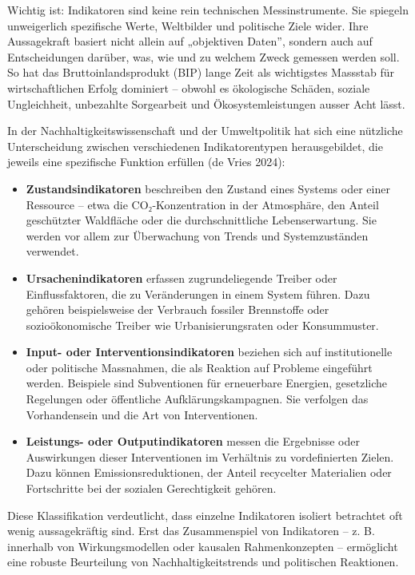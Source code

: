 \documentclass[
  nswissgerman,
  a4paper,
  DIV=11,
  numbers=noendperiod,
  oneside,
  openany]{scrreprt}
\begin{document}
Wichtig ist: Indikatoren sind keine rein technischen Messinstrumente.
Sie spiegeln unweigerlich spezifische Werte, Weltbilder und politische
Ziele wider. Ihre Aussagekraft basiert nicht allein auf „objektiven
Daten'', sondern auch auf Entscheidungen darüber, was, wie und zu
welchem Zweck gemessen werden soll. So hat das Bruttoinlandsprodukt
(BIP) lange Zeit als wichtigstes Massstab für wirtschaftlichen Erfolg
dominiert -- obwohl es ökologische Schäden, soziale Ungleichheit,
unbezahlte Sorgearbeit und Ökosystemleistungen ausser Acht lässt.

In der Nachhaltigkeitswissenschaft und der Umweltpolitik hat sich eine
nützliche Unterscheidung zwischen verschiedenen Indikatorentypen
herausgebildet, die jeweils eine spezifische Funktion erfüllen ({de
Vries} 2024):

\begin{itemize}
\item
  \textbf{Zustandsindikatoren} beschreiben den Zustand eines Systems
  oder einer Ressource -- etwa die CO₂-Konzentration in der Atmosphäre,
  den Anteil geschützter Waldfläche oder die durchschnittliche
  Lebenserwartung. Sie werden vor allem zur Überwachung von Trends und
  Systemzuständen verwendet.
\item
  \textbf{Ursachenindikatoren} erfassen zugrundeliegende Treiber oder
  Einflussfaktoren, die zu Veränderungen in einem System führen. Dazu
  gehören beispielsweise der Verbrauch fossiler Brennstoffe oder
  sozioökonomische Treiber wie Urbanisierungsraten oder Konsummuster.
\item
  \textbf{Input- oder Interventionsindikatoren} beziehen sich auf
  institutionelle oder politische Massnahmen, die als Reaktion auf
  Probleme eingeführt werden. Beispiele sind Subventionen für
  erneuerbare Energien, gesetzliche Regelungen oder öffentliche
  Aufklärungskampagnen. Sie verfolgen das Vorhandensein und die Art von
  Interventionen.
\item
  \textbf{Leistungs- oder Outputindikatoren} messen die Ergebnisse oder
  Auswirkungen dieser Interventionen im Verhältnis zu vordefinierten
  Zielen. Dazu können Emissionsreduktionen, der Anteil recycelter
  Materialien oder Fortschritte bei der sozialen Gerechtigkeit gehören.
\end{itemize}

Diese Klassifikation verdeutlicht, dass einzelne Indikatoren isoliert
betrachtet oft wenig aussagekräftig sind. Erst das Zusammenspiel von
Indikatoren -- z. B. innerhalb von Wirkungsmodellen oder kausalen
Rahmenkonzepten -- ermöglicht eine robuste Beurteilung von
Nachhaltigkeitstrends und politischen Reaktionen.
\end{document}
